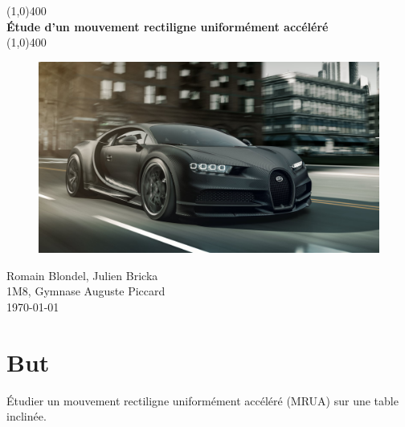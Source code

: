 \documentclass[11pt]{article}
\begin{document}
\begin{titlepage}
\begin{center}
\vspace{1cm}
\vfill
\line(1,0){400}\\
\huge{\textbf{Étude d’un mouvement rectiligne
uniformément accéléré}}\\
\line(1,0){400}\\
\vfill
\vfill
\begin{figure}[H]
  \includegraphics[scale=0.3]{la-voiture-noire-de-bugatti-modele-unique-photo-dr-1608828241.jpg}
\end{figure}
\vfill
Romain Blondel, Julien Bricka\\
1M8, Gymnase Auguste Piccard\\
\today
\end{center}
\end{titlepage}

\tableofcontents
\clearpage

\setcounter{page}{1}

\section{But}
Étudier un mouvement rectiligne uniformément accéléré (MRUA) sur une table inclinée.
\end{document}
